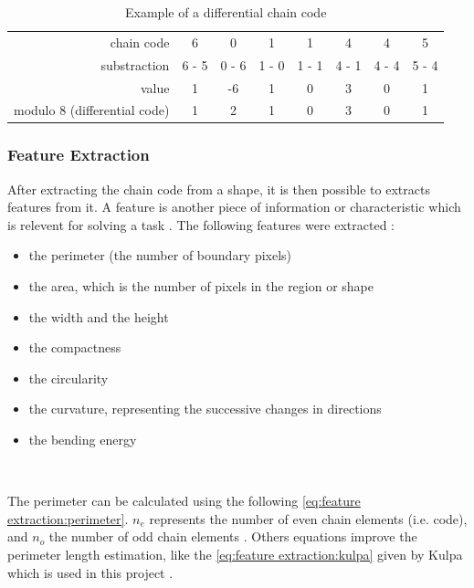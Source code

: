 \begin{table}[ht]
	\centering
	\caption{Example of a differential chain code}
	\label{tab:chain code:differential chain code}
	\begin{tabular}{rccccccc}
\toprule 
chain code   & 6     & 0     & 1     & 1     & 4     & 4     & 5     \\
substraction & 6 - 5 & 0 - 6 & 1 - 0 & 1 - 1 & 4 - 1 & 4 - 4 & 5 - 4 \\
value     	 & 1     & -6    & 1     & 0     & 3     & 0     & 1     \\
modulo 8 (differential code)  	 & 1     & 2     & 1     & 0     & 3     & 0     & 1     \\ 
\bottomrule 
	\end{tabular}
\end{table}



\subsubsection{Feature Extraction}


After extracting the chain code from a shape, it is then possible to extracts features from it. A feature is another piece of information or characteristic which is relevent for solving a task \cite{bib:extraction:definition}. The following features were extracted : 
\begin{itemize}
	\item the perimeter (the number of boundary pixels)
	\item the area, which is the number of pixels in the region or shape 
	\item the width and the height 
	\item the compactness 
	\item the circularity 
	\item the curvature, representing the successive changes in directions 
	\item the bending energy 
\end{itemize}

~~ 

The perimeter can be calculated using the following \vref{eq:feature extraction:perimeter}. $n_e$ represents the number of even chain elements (i.e. code), and $n_o$ the number of odd chain elements \cite{bib:chain:EstimateAreasAndPerimetersChainCode}. Others equations improve the perimeter length estimation, like the \vref{eq:feature extraction:kulpa} given by Kulpa which is used in this project \cite{bib:chain:ObjectDescription}.

